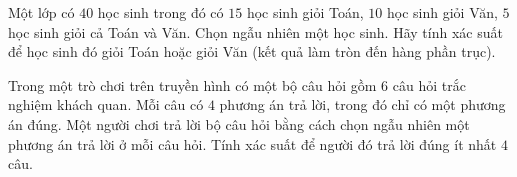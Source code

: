 \begin{bt}%
	Một lớp có $40$ học sinh trong đó có $15$ học sinh giỏi Toán, $10$ học sinh giỏi Văn, $5$ học sinh giỏi cả Toán và Văn. Chọn ngẫu nhiên một học sinh. Hãy tính xác suất để học sinh đó giỏi Toán hoặc giỏi Văn (kết quả làm tròn đến hàng phần trục).
\end{bt}

\begin{bt}%
	Trong một trò chơi trên truyền hình có một bộ câu hỏi gồm $6$ câu hỏi trắc nghiệm khách quan. Mỗi câu có $4$ phương án trả lời, trong đó chỉ có một phương án đúng. Một người chơi trả lời bộ câu hỏi bằng cách chọn ngẫu nhiên một phương án trả lời ở mỗi câu hỏi. Tính xác suất để người đó trả lời đúng ít nhất $4$ câu.
\end{bt}

